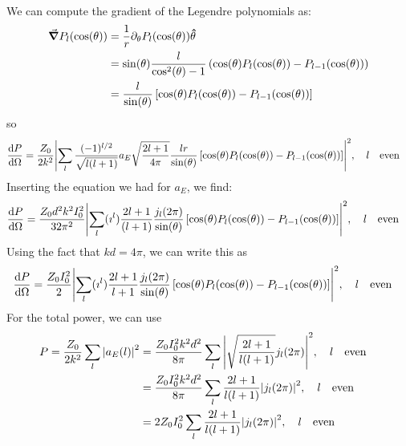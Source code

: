 \documentclass[a4paper,twoside]{article}
\begin{document}
\begin{itemize}
\begin{problem}
\begin{align}
            \end{align}
            We can compute the gradient of the Legendre polynomials as:
            \begin{align}
                \grad{P_l(\cos(\theta))} &= \frac{1}{r} \partial_{\theta} P_l(\cos(\theta)) \vu{\theta} \\
                &= \sin(\theta) \frac{l}{\cos[2](\theta) - 1} \left( \cos(\theta) P_l(\cos(\theta)) - P_{l-1}(\cos(\theta)) \right) \\
                &= \frac{l}{\sin(\theta)} \left[ \cos(\theta) P_l(\cos(\theta)) - P_{l-1}(\cos(\theta)) \right]
            \end{align}
            so
            \begin{equation}
                \dv{P}{\Omega} = \frac{Z_0}{2 k^2} \abs{\sum_l \frac{(-1)^{l/2}}{\sqrt{l(l+1)}} a_E \sqrt{\frac{2l+1}{4 \pi}} \frac{l r}{\sin(\theta)} \left[ \cos(\theta) P_l(\cos(\theta)) - P_{l-1}(\cos(\theta)) \right]}^2 \qc l \qeven
            \end{equation}
            Inserting the equation we had for $ a_E $, we find:
            \begin{equation}
                \dv{P}{\Omega} = \frac{Z_0 d^2 k^2 I_0^2}{32 \pi^2} \abs{ \sum_l(\imath^l) \frac{2l+1}{ (l+1)} \frac{j_l(2 \pi)}{\sin(\theta)} \left[ \cos(\theta) P_l(\cos(\theta)) - P_{l-1}(\cos(\theta)) \right]}^2 \qc l \qeven
            \end{equation}
            Using the fact that $ kd = 4 \pi $, we can write this as
            \begin{equation}
                \dv{P}{\Omega} = \frac{Z_0 I_0^2}{2} \abs{\sum_l (\imath^l) \frac{2l+1}{l+1} \frac{j_l(2 \pi)}{\sin(\theta)} \left[ \cos(\theta) P_l(\cos(\theta)) - P_{l-1}(\cos(\theta)) \right]}^2 \qc l \qeven
            \end{equation}
            For the total power, we can use
            \begin{align}
                P = \frac{Z_0}{2k^2} \sum_l \abs{a_E(l)}^2 &= \frac{Z_0 I_0^2 k^2 d^2}{8 \pi} \sum_l \abs{\sqrt{\frac{2l+1}{l(l+1)}} j_l(2 \pi)}^2 \qc l \qeven \\
                &= \frac{Z_0 I_0^2 k^2 d^2}{8 \pi} \sum_l \frac{2l+1}{l(l+1)} \abs{j_l(2 \pi)}^2 \qc l \qeven \\
                &= 2 Z_0 I_0^2 \sum_l \frac{2 l + 1}{l(l + 1)} \abs{j_l(2 \pi)}^2 \qc l \qeven
            \end{align}
        \end{problem}
\end{itemize}
\end{document}

